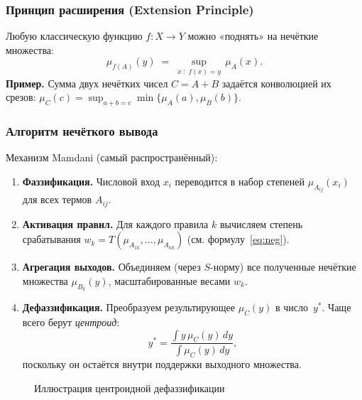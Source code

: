 \subsubsection{Принцип расширения (Extension Principle)}

Любую классическую функцию $f\colon X\to Y$
можно «поднять» на нечёткие множества:
\begin{equation}
  \mu_{f(A)}(y) \;=\;
  \sup_{x\;:\;f(x)=y}\,\mu_A(x).
\end{equation}
\textbf{Пример.}  
Сумма двух нечётких чисел $C=A+B$ задаётся
конволюцией их срезов:  
$\mu_C(c) = \sup_{a+b=c}\min\{\mu_A(a),\mu_B(b)\}$.

\subsubsection{Алгоритм нечёткого вывода}

Механизм Mamdani (самый распространённый):

\begin{enumerate}
  \item \textbf{Фаззификация.}  
        Числовой вход $x_i$ переводится
        в набор степеней $\mu_{A_{ij}}(x_i)$
        для всех термов $A_{ij}$.
  \item \textbf{Активация правил.}  
        Для каждого правила $k$ вычисляем
        степень срабатывания
        \(
          w_k = T(\mu_{A_{1k}},\dots,\mu_{A_{nk}})
        \)
        (см. формулу~\eqref{eq:neg}).
  \item \textbf{Агрегация выходов.}  
        Объединяем (через $S$-норму) все
        полученные нечёткие множества
        \(
          \mu_{B_k}(y)
        \),
        масштабированные весами $w_k$.
  \item \textbf{Дефаззификация.}  
        Преобразуем результирующее
        $\mu_C(y)$ в число~$y^\ast$.
        Чаще всего берут \emph{центроид}:
        \[
          y^\ast =
          \dfrac{\int y\,\mu_C(y)\,dy}{\int \mu_C(y)\,dy},
        \]
        поскольку он остаётся
        внутри поддержки выходного множества.
\end{enumerate}

\begin{figure}[h]
\centering
{}
\caption{Иллюстрация центроидной дефаззификации}
\label{fig:centroid}
\end{figure}

